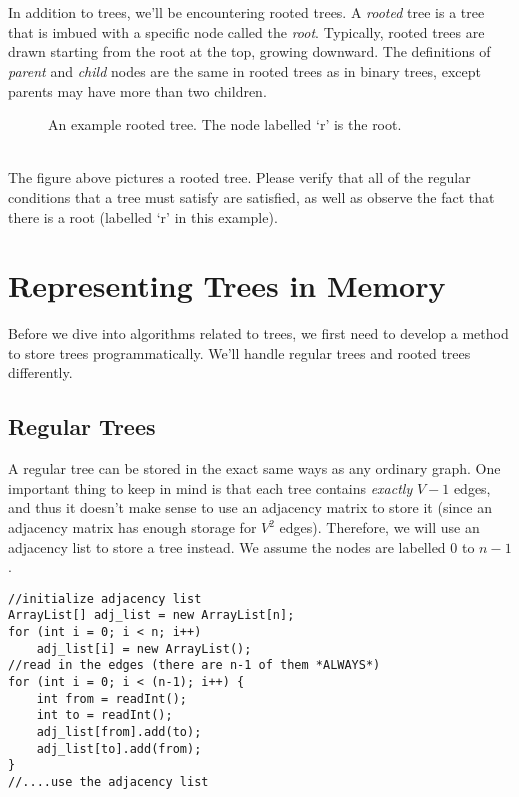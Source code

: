\documentclass[11pt]{article}
\theoremstyle{plain}
\theoremstyle{definition}
\begin{document}
\\\\
In addition to trees, we'll be encountering rooted trees. A \emph{rooted} tree is a tree that is imbued with a specific node called the \emph{root}. Typically, rooted trees are drawn starting from the root at the top, growing downward. The definitions of \emph{parent} and \emph{child} nodes are the same in rooted trees as in binary trees, except parents may have more than two children.
\begin{figure}[!ht]
\caption{An example rooted tree. The node labelled `r' is the root.}
\centering
{}
\end{figure}
\\
The figure above pictures a rooted tree. Please verify that all of the regular conditions that a tree must satisfy are satisfied, as well as observe the fact that there is a root (labelled `r' in this example).
\section{Representing Trees in Memory}
Before we dive into algorithms related to trees, we first need to develop a method to store trees programmatically. We'll handle regular trees and rooted trees differently.
\subsection{Regular Trees}
A regular tree can be stored in the exact same ways as any ordinary graph. One important thing to keep in mind is that each tree contains \emph{exactly} $V-1$ edges, and thus it doesn't make sense to use an adjacency matrix to store it (since an adjacency matrix has enough storage for $V^2$ edges). Therefore, we will use an adjacency list to store a tree instead. We assume the nodes are labelled $0$ to $n-1$.
\begin{lstlisting}
//initialize adjacency list
ArrayList[] adj_list = new ArrayList[n];
for (int i = 0; i < n; i++)
	adj_list[i] = new ArrayList();
//read in the edges (there are n-1 of them *ALWAYS*)
for (int i = 0; i < (n-1); i++) {
	int from = readInt();
	int to = readInt();
	adj_list[from].add(to);
	adj_list[to].add(from);
}
//....use the adjacency list
\end{lstlisting}
\end{document}

